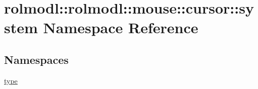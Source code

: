 \hypertarget{namespacerolmodl_1_1rolmodl_1_1mouse_1_1cursor_1_1system}{}\section{rolmodl\+::rolmodl\+::mouse\+::cursor\+::system Namespace Reference}
\label{namespacerolmodl_1_1rolmodl_1_1mouse_1_1cursor_1_1system}
\subsection*{Namespaces}
\begin{DoxyCompactItemize}
\item 
 \mbox{\hyperlink{namespacerolmodl_1_1rolmodl_1_1mouse_1_1cursor_1_1system_1_1type}{type}}
\end{DoxyCompactItemize}

